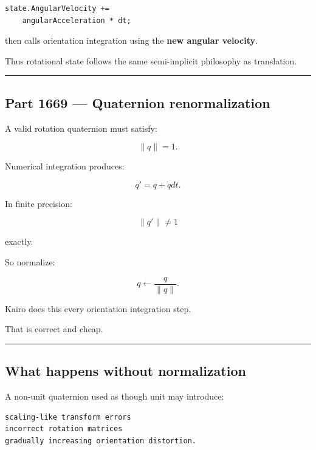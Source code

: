 \begin{verbatim}
state.AngularVelocity +=
    angularAcceleration * dt;
\end{verbatim}

then calls orientation integration using the \textbf{new angular velocity}.

Thus rotational state follows the same semi-implicit philosophy as translation.

\begin{center}\rule{0.5\linewidth}{0.5pt}\end{center}

\subsection{Part 1669 --- Quaternion renormalization}\label{06-engine-ii-ch037-part-1669-quaternion-renormalization}

\hypertarget{06-engine-ii-ch037-part-1669-quaternion-renormalization}{}

A valid rotation quaternion must satisfy:

\[
\|q\|=1.
\]

Numerical integration produces:

\[
q'
=
q+\dot qdt.
\]

In finite precision:

\[
\|q'\|
\neq1
\]

exactly.

So normalize:

\[
\boxed{
q
\leftarrow
\frac{q}{\|q\|}.
}
\]

Kairo does this every orientation integration step.

That is correct and cheap.

\begin{center}\rule{0.5\linewidth}{0.5pt}\end{center}

\subsection{What happens without normalization}\label{06-engine-ii-ch037-what-happens-without-normalization}

\hypertarget{06-engine-ii-ch037-what-happens-without-normalization}{}

A non-unit quaternion used as though unit may introduce:

\begin{verbatim}
scaling-like transform errors
incorrect rotation matrices
gradually increasing orientation distortion.
\end{verbatim}


